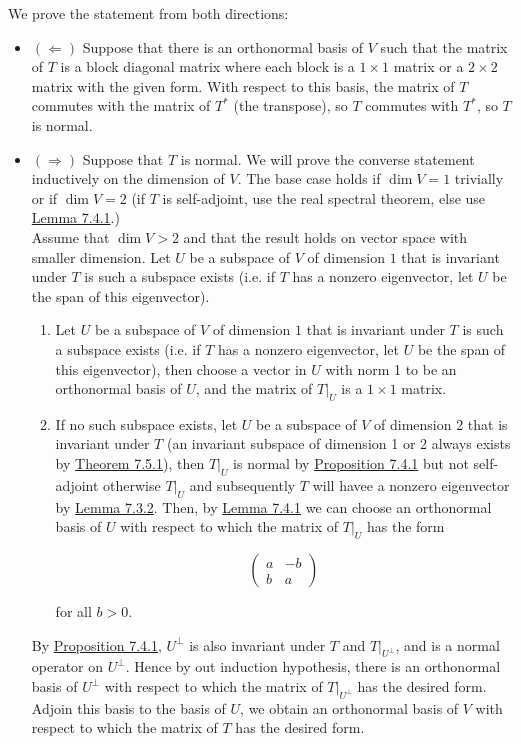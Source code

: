 \documentclass{report}
\begin{document}
	\begin{myproof} We prove the statement from both directions:
		\begin{itemize}
			\item $(\Leftarrow)$ Suppose that there is an orthonormal basis of $V$ such that the matrix of $T$ is a block diagonal matrix where each block is a $1\times 1$ matrix or a $2\times 2$ matrix with the given form. With respect to this basis, the matrix of $T$ commutes with the matrix of $T^*$ (the transpose), so $T$ commutes with $T^*$, so $T$ is normal.
			\item $(\Rightarrow)$ Suppose that $T$ is normal. We will prove the converse statement inductively on the dimension of $V$. The base case holds if $\dim V=1$ trivially or if $\dim V=2$ (if $T$ is self-adjoint, use the real spectral theorem, else use \hyperref[sec:Lem3]{Lemma 7.4.1}.)\\
			
			Assume that $\dim V>2$ and that the result holds on vector space with smaller dimension. Let $U$ be a subspace of $V$ of dimension $1$ that is invariant under $T$ is such a subspace exists (i.e. if $T$ has a nonzero eigenvector, let $U$ be the span of this eigenvector). \\
			
			\begin{enumerate}
				\item Let $U$ be a subspace of $V$ of dimension $1$ that is invariant under $T$ is such a subspace exists (i.e. if $T$ has a nonzero eigenvector, let $U$ be the span of this eigenvector), then choose a vector in $U$ with norm 1 to be an orthonormal basis of $U$, and the matrix of $T|_U$ is a $1\times 1$ matrix. 
				\item If no such subspace exists, let $U$ be a subspace of $V$ of dimension 2 that is invariant under $T$ (an invariant subspace of dimension 1 or 2 always exists by \hyperref[sec:Thm9]{Theorem 7.5.1}), then $T|_U$ is normal by \hyperref[sec:Prop7]{Proposition 7.4.1} but not self-adjoint otherwise $T|_U$ and subsequently $T$ will havee a nonzero eigenvector by \hyperref[sec:Lem2]{Lemma 7.3.2}. Then, by \hyperref[sec:Lem3]{Lemma 7.4.1} we can choose an orthonormal basis of $U$ with respect to which the matrix of $T|_U$ has the form 
				
				$$\begin{pmatrix}
					a & -b \\ b & a
				\end{pmatrix}$$
				
				for all $b>0$.
			\end{enumerate}
			By \hyperref[sec:Prop7]{Proposition 7.4.1}, $U^{\perp}$ is also invariant under $T$ and $T|_{U^{\perp}}$, and is a normal operator on $U^{\perp}$. Hence by out induction hypothesis, there is an orthonormal basis of $U^{\perp}$ with respect to which the matrix of $T|_{U^{\perp}}$ has the desired form. Adjoin this basis to the basis of $U$, we obtain an orthonormal basis of $V$ with respect to which the matrix of $T$ has the desired form.
		\end{itemize} 
	\end{myproof}
	
\end{document}
